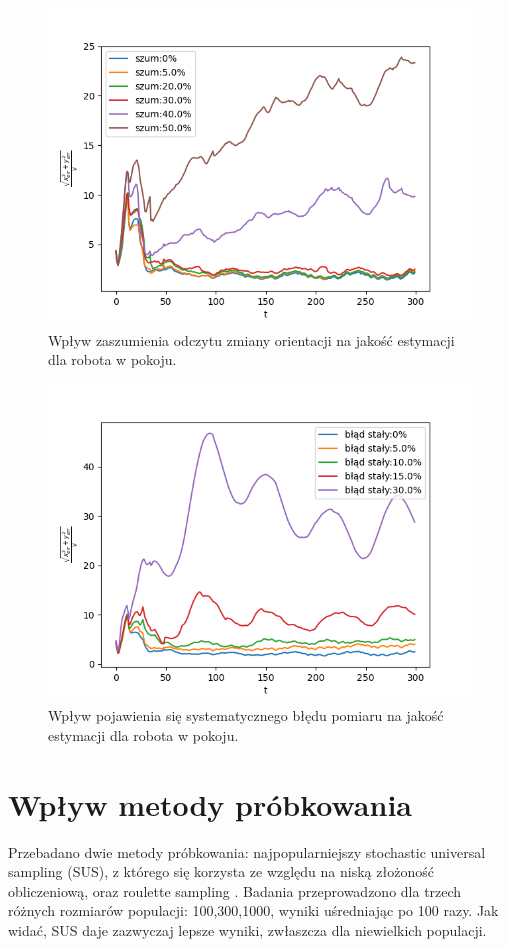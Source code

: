 \begin{figure}[H]
	\begin{center}
		\includegraphics[width=12cm]{./wplyw_szumu_ori.png}
		\caption{Wpływ zaszumienia odczytu zmiany orientacji na jakość estymacji dla robota w pokoju.}
		\label{wplyw_szumu_ori}
	\end{center}
\end{figure}

\begin{figure}[H]
	\begin{center}
		\includegraphics[width=12cm]{./blad_staly.png}
		\caption{Wpływ pojawienia się systematycznego błędu pomiaru na jakość estymacji dla robota w pokoju.}
		\label{blad_staly}
	\end{center}
\end{figure}

\section{Wpływ metody próbkowania}
Przebadano dwie metody próbkowania: najpopularniejszy stochastic universal sampling \cite{sus_wiki} (SUS), z którego się korzysta ze względu na niską złożoność obliczeniową, oraz roulette sampling \cite{rou_wiki}. Badania przeprowadzono dla trzech różnych rozmiarów populacji: 100,300,1000, wyniki uśredniając po 100 razy. Jak widać, SUS daje zazwyczaj lepsze wyniki, zwłaszcza dla niewielkich populacji. 

